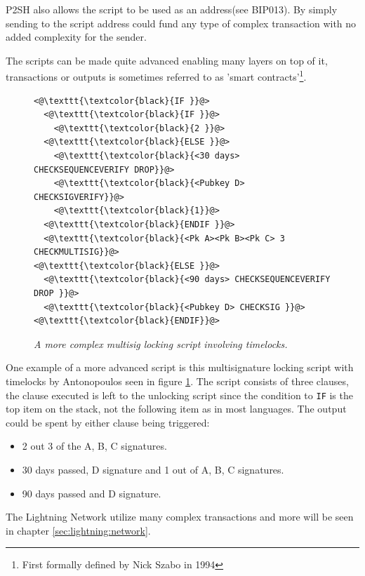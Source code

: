 P2SH also allows the script to be used as an address(see BIP013\cite{bip:0013:p2shaddr}). By simply sending to the script address could fund any type of complex transaction with no added complexity for the sender.

The scripts can be made quite advanced enabling many layers on top of it, transactions or outputs is sometimes referred to as 'smart contracts'\footnote{First formally defined by Nick Szabo in 1994\cite{szabo:smart:contracts}}.

\begin{figure}[hbt!]
	
	\begin{lstlisting}	
<@\texttt{\textcolor{black}{IF }}@>
  <@\texttt{\textcolor{black}{IF }}@>
    <@\texttt{\textcolor{black}{2 }}@>
  <@\texttt{\textcolor{black}{ELSE }}@>
    <@\texttt{\textcolor{black}{<30 days> CHECKSEQUENCEVERIFY DROP}}@>
    <@\texttt{\textcolor{black}{<Pubkey D> CHECKSIGVERIFY}}@>
    <@\texttt{\textcolor{black}{1}}@>
  <@\texttt{\textcolor{black}{ENDIF }}@>
  <@\texttt{\textcolor{black}{<Pk A><Pk B><Pk C> 3 CHECKMULTISIG}}@>
<@\texttt{\textcolor{black}{ELSE }}@>
  <@\texttt{\textcolor{black}{<90 days> CHECKSEQUENCEVERIFY DROP }}@>
  <@\texttt{\textcolor{black}{<Pubkey D> CHECKSIG }}@>
<@\texttt{\textcolor{black}{ENDIF}}@>

	\end{lstlisting}
	
	\caption{\textit{ A more complex multisig locking script involving timelocks.
	}}
	\label{fig:aantop:multi}
\end{figure}

One example of a more advanced script is this multisignature locking script with timelocks by Antonopoulos seen in figure \ref{fig:aantop:multi}\cite{antonopoulos:bitcoin:scripting}. The script consists of three clauses, the clause executed is left to the unlocking script since the condition to \texttt{IF} is the top item on the stack, not the following item as in most languages. The output could be spent by either clause being triggered:
\begin{itemize}
	\item 2 out 3 of the A, B, C signatures.
	\item 30 days passed, D signature and 1 out of A, B, C signatures.
	\item 90 days passed and D signature.
\end{itemize} 

The Lightning Network utilize many complex transactions and more will be seen in chapter \ref{sec:lightning:network}.


